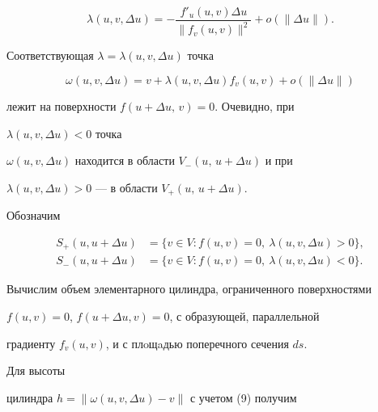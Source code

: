 \begin{equation}


\lambda(u,v,\Delta u)=-\frac{f'_u(u,v)\Delta u}


{\|f_v(u,v)\|^2}+o(\|\Delta u\|).


\end{equation}


Соответствующая $\lambda=\lambda(u,v,\Delta u)$ точка


\begin{equation}


\omega(u,v,\Delta u)=v+\lambda(u,v,\Delta u)


f_v(u,v)+o(\|\Delta u\|)


\end{equation}


лежит на поверхности $f(u+\Delta u,\,v)=0$. Очевидно, при 


$\lambda(u,v,\Delta u)<0$ точка 


$\omega(u,v,\Delta u)$ находится в области $V_-(u,\,u+\Delta u)$ и при 


$\lambda(u,v,\Delta u)>0$ --- в области $V_+(u,\,u+\Delta u)$.





Обозначим


\begin{equation}


\begin{split}


S_+(u,u+\Delta u)&=\{v\in V:f(u,v)=0,


\ \lambda(u,v,\Delta u)>0\},\\


S_-(u,u+\Delta u)&=\{v\in V:f(u,v)=0,


\ \lambda(u,v,\Delta u)<0\}.


\end{split}


\end{equation}





Вычислим объем элементарного цилиндра, ограниченного поверхностями


$f(u,v)=0$, $f(u+\Delta u,v)=0$, с образующей, параллельной


градиенту $f_v(u,v)$, и с плoщaдью поперечного сечения $ds$.


Для высоты 


цилиндра $h=\|\omega(u,v,\Delta u)-v\|$ с учетом (9) получим 


